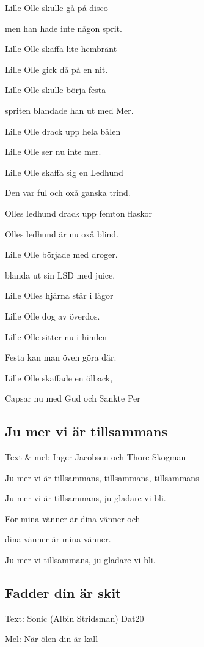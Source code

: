 Lille Olle skulle gå på disco

men han hade inte någon sprit.

Lille Olle skaffa lite hembränt

Lille Olle gick då på en nit.\bigskip

Lille Olle skulle börja festa

spriten blandade han ut med Mer.

Lille Olle drack upp hela bålen

Lille Olle ser nu inte mer.\bigskip

Lille Olle skaffa sig en Ledhund

Den var ful och oxå ganska trind.

Olles ledhund drack upp femton flaskor

Olles ledhund är nu oxå blind.\bigskip

Lille Olle började med droger.

blanda ut sin LSD med juice.

Lille Olles hjärna står i lågor

Lille Olle dog av överdos.\bigskip

Lille Olle sitter nu i himlen

Festa kan man öven göra där.

Lille Olle skaffade en ölback,

Capsar nu med Gud och Sankte Per\bigskip

\subsection{\textbf{Ju mer vi är tillsammans}}

Text \& mel: Inger Jacobsen och Thore Skogman \bigskip

Ju mer vi är tillsammans, tillsammans, tillsammans

Ju mer vi är tillsammans, ju gladare vi bli.

För mina vänner är dina vänner och

dina vänner är mina vänner.

Ju mer vi tillsammans, ju gladare vi bli. 

\subsection{\textbf{Fadder din är skit}}

Text: Sonic (Albin Stridsman) Dat20

Mel: När ölen din är kall\bigskip

